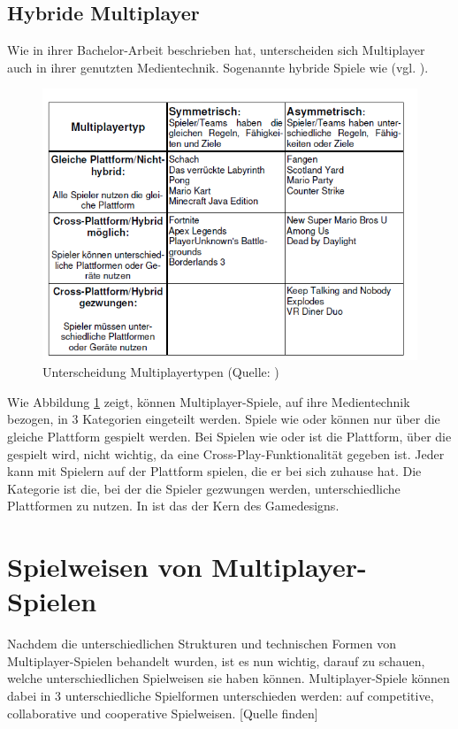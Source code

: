 \subsection{Hybride Multiplayer}
Wie \cite[S. 6f]{lotz_konzeption_2021} in ihrer Bachelor-Arbeit beschrieben hat, unterscheiden sich Multiplayer auch in ihrer genutzten Medientechnik. Sogenannte hybride Spiele wie  (vgl. \cite{noauthor_mario_nodate-1}).

\begin{figure}[ht]
\centering
\includegraphics[width=1\linewidth]{content/pictures/lotz_hybrid_multiplayer.PNG}
\caption{Unterscheidung Multiplayertypen (Quelle: \cite[S.6]{lotz_konzeption_2021})}
\label{fig:lotz_multiplayer_types}
\end{figure}

Wie Abbildung \ref{fig:lotz_multiplayer_types} zeigt, können Multiplayer-Spiele, auf ihre Medientechnik bezogen, in 3 Kategorien eingeteilt werden.
Spiele wie  oder  können nur über die gleiche Plattform gespielt werden. Bei Spielen wie  oder  ist die Plattform, über die gespielt wird, nicht wichtig, da eine Cross-Play-Funktionalität gegeben ist. Jeder kann mit Spielern auf der Plattform spielen, die er bei sich zuhause hat. Die Kategorie ist die, bei der die Spieler gezwungen werden, unterschiedliche Plattformen zu nutzen. In  ist das der Kern des Gamedesigns.

\section{Spielweisen von Multiplayer-Spielen}
Nachdem die unterschiedlichen Strukturen und technischen Formen von Multiplayer-Spielen behandelt wurden, ist es nun wichtig, darauf zu schauen, welche unterschiedlichen Spielweisen sie haben können. Multiplayer-Spiele können dabei in 3 unterschiedliche Spielformen unterschieden werden:
auf competitive, collaborative und cooperative Spielweisen. [Quelle finden]

